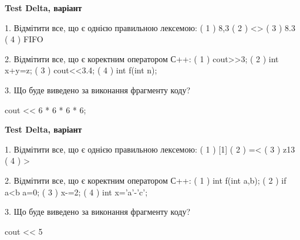 \documentclass[11pt, ukrainian]{article}
\begin{document}
\begin{large}
\textbf{Test Delta, варіант }\par

1. Відмітити все, що є однією правильною лексемою:
( 1 ) 8,3  
( 2 ) <>  
( 3 ) 8.3  
( 4 ) FIFO


2. Відмітити все, що є коректним оператором С++:
( 1 ) cout>>3;  
( 2 ) int x+y=z;  
( 3 ) cout<<3.4;  
( 4 ) int f(int n);


3. Що буде виведено за виконання фрагменту коду?

cout << 6 * 6 * 6 * 6;

\end{large}
\vspace{20mm}
\begin{large}
\textbf{Test Delta, варіант }\par

1. Відмітити все, що є однією правильною лексемою:
( 1 ) [1]  
( 2 ) =<  
( 3 ) z13  
( 4 ) >


2. Відмітити все, що є коректним оператором С++:
( 1 ) int f(int a,b);  
( 2 ) if a<b a=0;  
( 3 ) x-=2;  
( 4 ) int x='a'-'c';


3. Що буде виведено за виконання фрагменту коду?

cout << 5 %

\end{large}
\newpage
\end{document}
